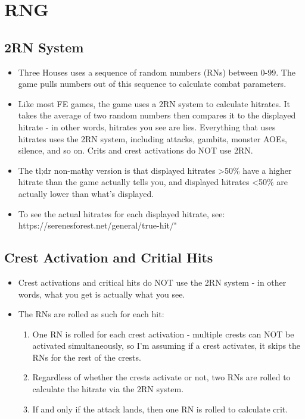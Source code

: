 \section*{RNG}

\subsection*{2RN System}
\begin{itemize}
\item Three Houses uses a sequence of random numbers (RNs) between 0-99. The game pulls numbers out of this sequence to calculate combat parameters.
\item Like most FE games, the game uses a 2RN system to calculate hitrates. It takes the average of two random numbers then compares it to the displayed hitrate - in other words, hitrates you see are lies. Everything that uses hitrates uses the 2RN system, including attacks, gambits, monster AOEs, silence, and so on. Crits and crest activations do NOT use 2RN.
\item The tl;dr non-mathy version is that displayed hitrates >50\% have a higher hitrate than the game actually tells you, and displayed hitrates <50\% are actually lower than what's displayed. 
\item To see the actual hitrates for each displayed hitrate, see: https://serenesforest.net/general/true-hit/"											
\end{itemize}

\subsection*{Crest Activation and Critial Hits}
\begin{itemize}
\item Crest activations and critical hits do NOT use the 2RN system - in other words, what you get is actually what you see.
\item The RNs are rolled as such for each hit:
\begin{enumerate}
\item One RN is rolled for each crest activation - multiple crests can NOT be activated simultaneously, so I'm assuming if a crest activates, it skips the RNs for the rest of the crests.
\item Regardless of whether the crests activate or not, two RNs are rolled to calculate the hitrate via the 2RN system.
\item If and only if the attack lands, then one RN is rolled to calculate crit.
\end{enumerate}
\end{itemize}

